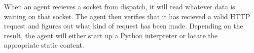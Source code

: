 \documentclass[11pt]{article}
\begin{document}
When an agent recieves a socket from dispatch, it will read whatever data is waiting on that socket. The agent then verifies that it has recieved a valid HTTP request and figures out what kind of request has been made. Depending on the result, the agent will either start up a Python interpreter or locate the appropriate static content.
\end{document}
